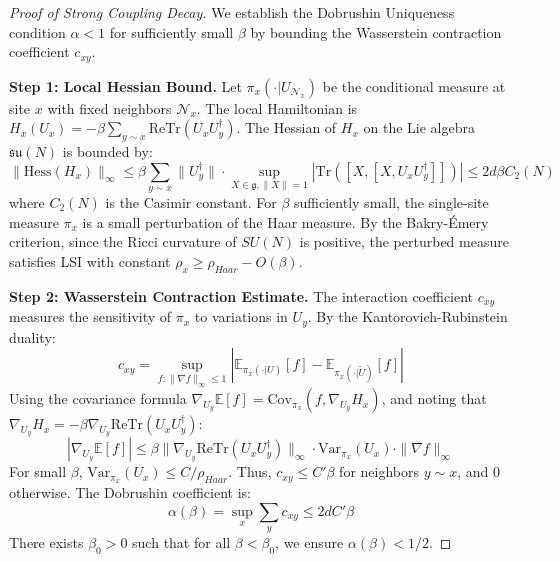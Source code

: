 \begin{proof}[Proof of Strong Coupling Decay]
We establish the Dobrushin Uniqueness condition $\alpha < 1$ for sufficiently small $\beta$ by bounding the Wasserstein contraction coefficient $c_{xy}$.

\textbf{Step 1: Local Hessian Bound.}
Let $\pi_x(\cdot | U_{\mathcal{N}_x})$ be the conditional measure at site $x$ with fixed neighbors $\mathcal{N}_x$. The local Hamiltonian is $H_x(U_x) = -\beta \sum_{y \sim x} \mathrm{Re}\mathrm{Tr}(U_x U_y^\dagger)$.
The Hessian of $H_x$ on the Lie algebra $\mathfrak{su}(N)$ is bounded by:
\begin{equation}
\|\mathrm{Hess}(H_x)\|_\infty \le \beta \sum_{y \sim x} \|U_y^\dagger\| \cdot \sup_{X \in \mathfrak{g}, \|X\|=1} |\mathrm{Tr}([X,[X, U_x U_y^\dagger]])| \le 2d \beta C_2(N)
\end{equation}
where $C_2(N)$ is the Casimir constant. For $\beta$ sufficiently small, the single-site measure $\pi_x$ is a small perturbation of the Haar measure. By the Bakry-Émery criterion, since the Ricci curvature of $SU(N)$ is positive, the perturbed measure satisfies LSI with constant $\rho_x \ge \rho_{Haar} - O(\beta)$.

\textbf{Step 2: Wasserstein Contraction Estimate.}
The interaction coefficient $c_{xy}$ measures the sensitivity of $\pi_x$ to variations in $U_y$. By the Kantorovich-Rubinstein duality:
\begin{equation}
c_{xy} = \sup_{f: \|\nabla f\|_\infty \le 1} \left| \mathbb{E}_{\pi_x(\cdot|U)}[f] - \mathbb{E}_{\pi_x(\cdot|\tilde{U})}[f] \right|
\end{equation}
Using the covariance formula $\nabla_{U_y} \mathbb{E}[f] = \mathrm{Cov}_{\pi_x}(f, \nabla_{U_y} H_x)$, and noting that $\nabla_{U_y} H_x = -\beta \nabla_{U_y} \mathrm{Re}\mathrm{Tr}(U_x U_y^\dagger)$:
\begin{equation}
|\nabla_{U_y} \mathbb{E}[f]| \le \beta \|\nabla_{U_y} \mathrm{Re}\mathrm{Tr}(U_x U_y^\dagger)\|_\infty \cdot \mathrm{Var}_{\pi_x}(U_x) \cdot \|\nabla f\|_\infty
\end{equation}
For small $\beta$, $\mathrm{Var}_{\pi_x}(U_x) \le C / \rho_{Haar}$.
Thus, $c_{xy} \le C' \beta$ for neighbors $y \sim x$, and 0 otherwise.
The Dobrushin coefficient is:
\begin{equation}
\alpha(\beta) = \sup_x \sum_y c_{xy} \le 2d C' \beta
\end{equation}
There exists $\beta_0 > 0$ such that for all $\beta < \beta_0$, we ensure $\alpha(\beta) < 1/2$.


\end{proof}
